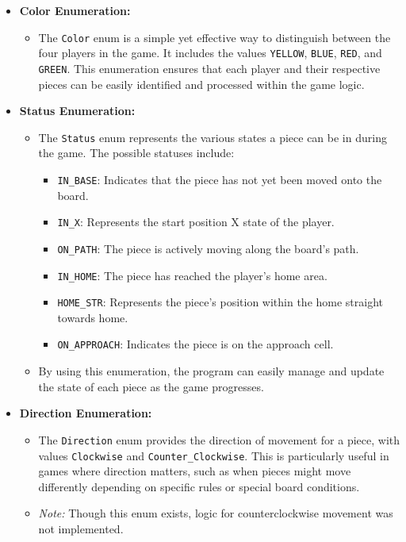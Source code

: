 \documentclass[a4paper,12pt]{article}
\begin{document}
\begin{itemize}
    \item \textbf{Color Enumeration:}
    \begin{itemize}
        \item The \texttt{Color} enum is a simple yet effective way to distinguish between the four players in the game. It includes the values \texttt{YELLOW}, \texttt{BLUE}, \texttt{RED}, and \texttt{GREEN}. This enumeration ensures that each player and their respective pieces can be easily identified and processed within the game logic.
    \end{itemize}

    \item \textbf{Status Enumeration:}
    \begin{itemize}
        \item The \texttt{Status} enum represents the various states a piece can be in during the game. The possible statuses include:
        \begin{itemize}
            \item \texttt{IN\_BASE}: Indicates that the piece has not yet been moved onto the board.
            \item \texttt{IN\_X}: Represents the start position X state of the player.
            \item \texttt{ON\_PATH}: The piece is actively moving along the board's path.
            \item \texttt{IN\_HOME}: The piece has reached the player's home area.
            \item \texttt{HOME\_STR}: Represents the piece's position within the home straight towards home.
            \item \texttt{ON\_APPROACH}: Indicates the piece is on the approach cell.
        \end{itemize}
        \item By using this enumeration, the program can easily manage and update the state of each piece as the game progresses.
    \end{itemize}

    \item \textbf{Direction Enumeration:}
    \begin{itemize}
        \item The \texttt{Direction} enum provides the direction of movement for a piece, with values \texttt{Clockwise} and \texttt{Counter\_Clockwise}. This is particularly useful in games where direction matters, such as when pieces might move differently depending on specific rules or special board conditions.
        \item \textit{Note:} Though this enum exists, logic for counterclockwise movement was not implemented.
    \end{itemize}
\end{itemize}
\end{document}
